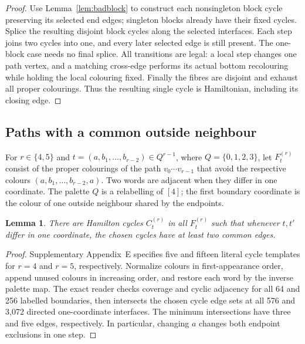 \documentclass[11pt]{article}
\newtheorem{lemma}[theorem]{Lemma}
\theoremstyle{remark}
\numberwithin{equation}{section}
\numberwithin{table}{section}
\begin{document}
\begin{proof}
Use Lemma~\ref{lem:badblock} to construct each nonsingleton block
cycle preserving its selected end edges; singleton blocks already
have their fixed cycles. Splice the resulting disjoint block cycles
along the selected interfaces. Each step joins two cycles into one,
and every later selected edge is still present. The one-block case
needs no final splice. All transitions are legal: a local step changes
one path vertex, and a matching cross-edge performs its actual bottom
recolouring while holding the local colouring fixed. Finally the fibres
are disjoint and exhaust all proper colourings. Thus the resulting
single cycle is Hamiltonian, including its closing edge.
\end{proof}


\subsection{Paths with a common outside neighbour}

For $r\in\{4,5\}$ and $t=(a,b_1,\ldots,b_{r-2})\in Q^{r-1}$, where
$Q=\{0,1,2,3\}$, let $F_t^{(r)}$ consist of the proper colourings of
the path $v_0\cdots v_{r-1}$ that avoid the respective colours
$(a,b_1,\ldots,b_{r-2},a)$. Two words are adjacent when they differ in
one coordinate. The palette $Q$ is a relabelling of $[4]$; the first
boundary coordinate is the colour of one outside neighbour shared by
the endpoints.

\begin{lemma}\label{lem:shared-hub-path-data}
There are Hamilton cycles $C_t^{(r)}$ in all $F_t^{(r)}$ such that
whenever $t,t'$ differ in one coordinate, the chosen cycles have at
least two common edges.
\end{lemma}
\begin{proof}
Supplementary Appendix~E specifies five and fifteen literal cycle templates
for $r=4$ and $r=5$, respectively. Normalize colours in first-appearance
order, append unused colours in increasing order, and restore each word
by the inverse palette map. The exact reader checks coverage and cyclic
adjacency for all 64 and 256 labelled boundaries, then intersects the chosen
cycle edge sets at all 576 and 3,072 directed one-coordinate interfaces.
The minimum intersections have three and five edges, respectively.
In particular, changing $a$ changes both endpoint exclusions in one step.
\end{proof}
\end{document}
